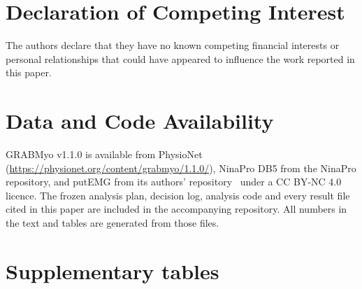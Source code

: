 \documentclass[final,5p,times,twocolumn]{elsarticle}
\newif\ifrevhighlight
\newcommand{\rev}[1]{\ifrevhighlight{\color{blue}#1}\else#1\fi}
\begin{document}







\section*{Declaration of Competing Interest}
The authors declare that they have no known competing financial interests or personal relationships that could have appeared to influence the work reported in this paper.

\section*{Data and Code Availability}
GRABMyo v1.1.0 is available from PhysioNet (\url{https://physionet.org/content/grabmyo/1.1.0/}), NinaPro DB5 from the NinaPro repository\rev{, and putEMG from its authors' repository~\cite{kaczmarek2019putemg} under a CC BY-NC 4.0 licence}. The frozen analysis plan, decision log, analysis code and every result file cited in this paper are included in the accompanying repository. All numbers in the text and tables are generated from those files.

\appendix
\section{Supplementary tables}









\end{document}
